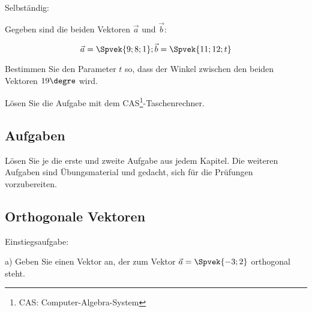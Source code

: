 
  Selbständig:

Gegeben sind die beiden Vektoren $\vec{a}$ und $\vec{b}$:

$$\vec{a} = \Spvek{9;8;1}; \vec{b} = \Spvek{11;12;t}$$

Bestimmen Sie den Parameter $t$ so, dass der Winkel zwischen den
beiden Vektoren $19\degre$ wird.

Lösen Sie die Aufgabe mit dem CAS\footnote{CAS: Computer-Algebra-System}-Taschenrechner.


  \newpage
  
  \subsection*{Aufgaben}

Lösen Sie je die erste und zweite Aufgabe aus jedem Kapitel. Die weiteren Aufgaben
sind Übungsmaterial und gedacht, sich für die Prüfungen vorzubereiten.




\newpage

\subsection{Orthogonale Vektoren}


Einstiegsaufgabe:

a) Geben Sie einen Vektor an, der zum Vektor $\vec{a} = \Spvek{-3;2}$
orthogonal steht.

